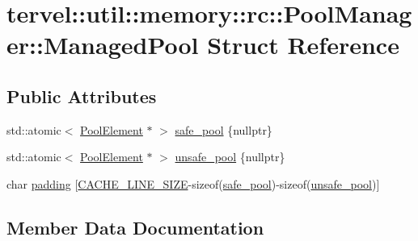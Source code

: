 \hypertarget{structtervel_1_1util_1_1memory_1_1rc_1_1_pool_manager_1_1_managed_pool}{}\section{tervel\+:\+:util\+:\+:memory\+:\+:rc\+:\+:Pool\+Manager\+:\+:Managed\+Pool Struct Reference}
\label{structtervel_1_1util_1_1memory_1_1rc_1_1_pool_manager_1_1_managed_pool}
\subsection*{Public Attributes}
\begin{DoxyCompactItemize}
\item 
std\+::atomic$<$ \hyperlink{classtervel_1_1util_1_1memory_1_1rc_1_1_pool_element}{Pool\+Element} $\ast$ $>$ \hyperlink{structtervel_1_1util_1_1memory_1_1rc_1_1_pool_manager_1_1_managed_pool_a629673750afb186a300d9a387c1f5bce}{safe\+\_\+pool} \{nullptr\}
\item 
std\+::atomic$<$ \hyperlink{classtervel_1_1util_1_1memory_1_1rc_1_1_pool_element}{Pool\+Element} $\ast$ $>$ \hyperlink{structtervel_1_1util_1_1memory_1_1rc_1_1_pool_manager_1_1_managed_pool_aca865c03268b33d1e2ae18ce8f861abe}{unsafe\+\_\+pool} \{nullptr\}
\item 
char \hyperlink{structtervel_1_1util_1_1memory_1_1rc_1_1_pool_manager_1_1_managed_pool_a1c5d4e16c41dc07c936d6192e4e25775}{padding} \mbox{[}\hyperlink{system_8h_af89f60b07247176687889ade776c8e10}{C\+A\+C\+H\+E\+\_\+\+L\+I\+N\+E\+\_\+\+S\+I\+Z\+E}-\/sizeof(\hyperlink{structtervel_1_1util_1_1memory_1_1rc_1_1_pool_manager_1_1_managed_pool_a629673750afb186a300d9a387c1f5bce}{safe\+\_\+pool})-\/sizeof(\hyperlink{structtervel_1_1util_1_1memory_1_1rc_1_1_pool_manager_1_1_managed_pool_aca865c03268b33d1e2ae18ce8f861abe}{unsafe\+\_\+pool})\mbox{]}
\end{DoxyCompactItemize}


\subsection{Member Data Documentation}
\hypertarget{structtervel_1_1util_1_1memory_1_1rc_1_1_pool_manager_1_1_managed_pool_a1c5d4e16c41dc07c936d6192e4e25775}{}
